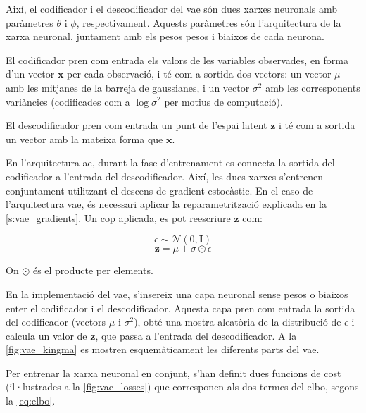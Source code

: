 \documentclass[CAT,BIB]{TFUOC}%
\begin{document}
        Així, el codificador i el descodificador del \gls{vae} són
        dues xarxes neuronals amb paràmetres $\theta$ i $\phi$, respectivament.
        Aquests paràmetres són l'arquitectura de la xarxa neuronal,
        juntament amb els pesos pesos i biaixos de cada neurona.

        El codificador pren com entrada els valors de les variables observades,
        en forma d'un vector $\mathbf{x}$ per cada observació,
        i té com a sortida dos vectors:
        un vector $\mu$ amb les mitjanes de la barreja de gaussianes,
        i un vector $\sigma^2$ amb les corresponents variàncies
        (codificades com a $\log \sigma^2$ per motius de computació).

        El descodificador pren com entrada un punt de l'espai latent $\mathbf{z}$
        i té com a sortida un vector amb la mateixa forma que $\mathbf{x}$.

        En l'arquitectura \gls{ae},
        durant la fase d'entrenament
        es connecta la sortida del codificador a l'entrada del descodificador.
        Així, les dues xarxes s'entrenen conjuntament
        utilitzant el descens de gradient estocàstic.
        En el caso de l'arquitectura \gls{vae},
        és necessari aplicar la reparametrització
        explicada en la \cref{s:vae_gradients}.
        Un cop aplicada, es pot reescriure $\mathbf{z}$ com:

        $$\epsilon \sim \mathcal{N}(0, \mathbf{I})$$
        $$\mathbf{z} = \mu + \sigma \odot \epsilon$$

        On $\odot$ és el producte per elements.

        En la implementació del \gls{vae},
        s'insereix una capa neuronal sense pesos o biaixos
        enter el codificador i el descodificador.
        Aquesta capa pren com entrada la sortida del codificador
        (vectors $\mu$ i $\sigma^2$),
        obté una mostra aleatòria de la distribució de $\epsilon$
        i calcula un valor de $\mathbf{z}$,
        que passa a l'entrada del descodificador.
        A la \cref{fig:vae_kingma} es mostren esquemàticament
        les diferents parts del \gls{vae}.

        Per entrenar la xarxa neuronal en conjunt,
        s'han definit dues funcions de cost
        (il·lustrades a la \cref{fig:vae_losses})
        que corresponen als dos termes del \gls{elbo},
        segons la \cref{eq:elbo}.
\end{document}

